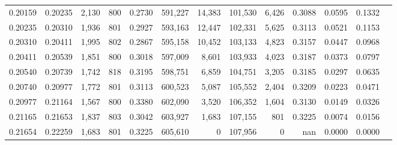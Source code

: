 \begin{tabular}{rrrrrrrrrrrrr}
0.20159 & 0.20235 &  2,130 & 800 &                                     0.2730 & 591,227 &  14,383 & 101,530 &   6,426 & 0.3088 & 0.0595 & 0.1332 \\
0.20235 & 0.20310 &  1,936 & 801 &                                     0.2927 & 593,163 &  12,447 & 102,331 &   5,625 & 0.3113 & 0.0521 & 0.1153 \\
0.20310 & 0.20411 &  1,995 & 802 &                                     0.2867 & 595,158 &  10,452 & 103,133 &   4,823 & 0.3157 & 0.0447 & 0.0968 \\
0.20411 & 0.20539 &  1,851 & 800 &                                     0.3018 & 597,009 &   8,601 & 103,933 &   4,023 & 0.3187 & 0.0373 & 0.0797 \\
0.20540 & 0.20739 &  1,742 & 818 &                                     0.3195 & 598,751 &   6,859 & 104,751 &   3,205 & 0.3185 & 0.0297 & 0.0635 \\
0.20740 & 0.20977 &  1,772 & 801 &                                     0.3113 & 600,523 &   5,087 & 105,552 &   2,404 & 0.3209 & 0.0223 & 0.0471 \\
0.20977 & 0.21164 &  1,567 & 800 &                                     0.3380 & 602,090 &   3,520 & 106,352 &   1,604 & 0.3130 & 0.0149 & 0.0326 \\
0.21165 & 0.21653 &  1,837 & 803 &                                     0.3042 & 603,927 &   1,683 & 107,155 &     801 & 0.3225 & 0.0074 & 0.0156 \\
0.21654 & 0.22259 &  1,683 & 801 &                                     0.3225 & 605,610 &       0 & 107,956 &       0 &    nan & 0.0000 & 0.0000 \\
\bottomrule
\end{tabular}
